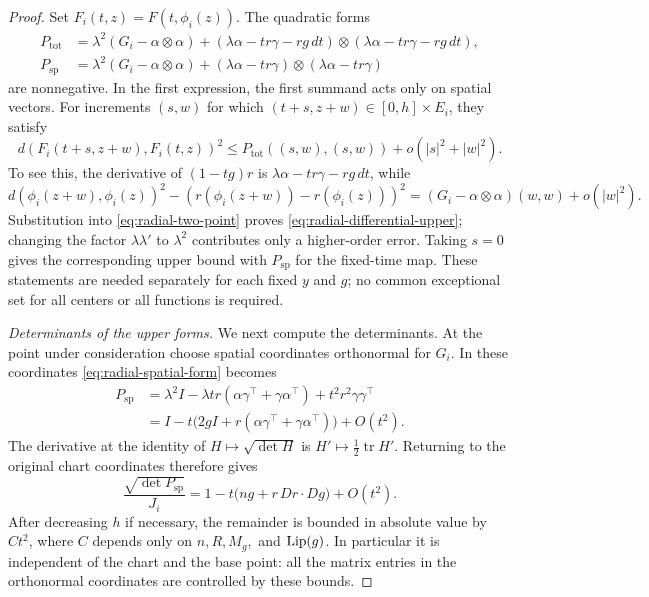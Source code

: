 \begin{proof}
Set $F_i(t,z)=F(t,\phi_i(z))$.  The quadratic forms
\begin{align}
 P_{\mathrm{tot}}
 &=\lambda^2(G_i-\alpha\otimes\alpha)
   +(\lambda\alpha-tr\gamma-rg\,dt)
       \otimes(\lambda\alpha-tr\gamma-rg\,dt),
       \label{eq:radial-total-form}\\
 P_{\mathrm{sp}}
 &=\lambda^2(G_i-\alpha\otimes\alpha)
   +(\lambda\alpha-tr\gamma)\otimes(\lambda\alpha-tr\gamma)
       \label{eq:radial-spatial-form}
\end{align}
are nonnegative.  In the first expression, the first summand acts
only on spatial vectors.  For increments $(s,w)$ for which
$(t+s,z+w)\in[0,h]\times E_i$, they satisfy
\begin{equation}
 d(F_i(t+s,z+w),F_i(t,z))^2
 \leq P_{\mathrm{tot}}((s,w),(s,w))
       +o(|s|^2+|w|^2).
 \label{eq:radial-differential-upper}
\end{equation}
To see this, the derivative of $(1-tg)r$ is
$\lambda\alpha-tr\gamma-rg\,dt$, while
\[
 d(\phi_i(z+w),\phi_i(z))^2
 -(r(\phi_i(z+w))-r(\phi_i(z)))^2
 =(G_i-\alpha\otimes\alpha)(w,w)+o(|w|^2).
\]
Substitution into \eqref{eq:radial-two-point} proves
\eqref{eq:radial-differential-upper}; changing the factor
$\lambda\lambda'$ to $\lambda^2$ contributes only a higher-order
error.  Taking $s=0$ gives the corresponding upper bound with
$P_{\mathrm{sp}}$ for the fixed-time map.  These statements are
needed separately for each fixed $y$ and $g$; no common exceptional
set for all centers or all functions is required.

\emph{Determinants of the upper forms.}
We next compute the determinants.  At the point under consideration
choose spatial coordinates orthonormal for $G_i$.  In these
coordinates \eqref{eq:radial-spatial-form} becomes
\begin{align*}
 P_{\mathrm{sp}}
 &=\lambda^2 I-\lambda tr(\alpha\gamma^\top+
                         \gamma\alpha^\top)
                    +t^2r^2\gamma\gamma^\top\\
 &=I-t\bigl(2gI+r(\alpha\gamma^\top+
                         \gamma\alpha^\top)\bigr)+O(t^2).
\end{align*}
The derivative at the identity of $H\mapsto\sqrt{\det H}$ is
$H'\mapsto\tfrac12\operatorname{tr}H'$.  Returning to the original
chart coordinates therefore gives
\begin{equation}
 \frac{\sqrt{\det P_{\mathrm{sp}}}}{J_i}
 =1-t\bigl(ng+r\,Dr\cdot Dg\bigr)+O(t^2).
 \label{eq:radial-spatial-jacobian}
\end{equation}
After decreasing $h$ if necessary, the remainder is bounded in
absolute value by $Ct^2$, where $C$ depends only on
$n,R,M_g,$ and $\operatorname{Lip}(g)$.  In particular it is independent of the
chart and the base point: all the matrix entries in the orthonormal
coordinates are controlled by these bounds.


\end{proof}
